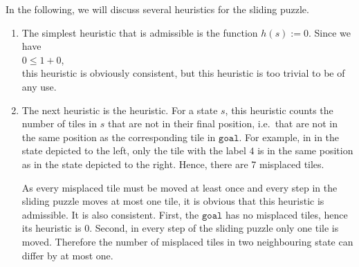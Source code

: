 \examples
In the following, we will discuss several heuristics for the sliding puzzle. 
\begin{enumerate}
\item The simplest heuristic that is admissible is the function $h(s) := 0$.  Since we have
      \\[0.2cm]
      \hspace*{1.3cm}
      $0 \leq 1 + 0$,
      \\[0.2cm]
      this heuristic is obviously consistent, but this heuristic is too trivial to be of any use.
\item The next heuristic is the  heuristic.  For a state $s$, 
      this heuristic counts the number of tiles in $s$ that are not in their final position, i.e.~that are not
      in the same position as the corresponding tile in $\mathtt{goal}$.  For example, in 
      in the state depicted to the left, only the tile with the label $4$ is in the same
      position as in the state depicted to the right.  Hence, there are 7 misplaced tiles.

      As every misplaced tile must be moved at least once and every step in the sliding puzzle moves at most
      one tile, it is obvious that this heuristic is admissible.  It is also consistent.  First, the
      $\mathtt{goal}$ has no misplaced tiles, hence its heuristic is $0$.  Second, in every step of the sliding
      puzzle  only one tile is moved.  Therefore the number of misplaced tiles in two neighbouring state can
      differ by at most one.


\end{enumerate}
